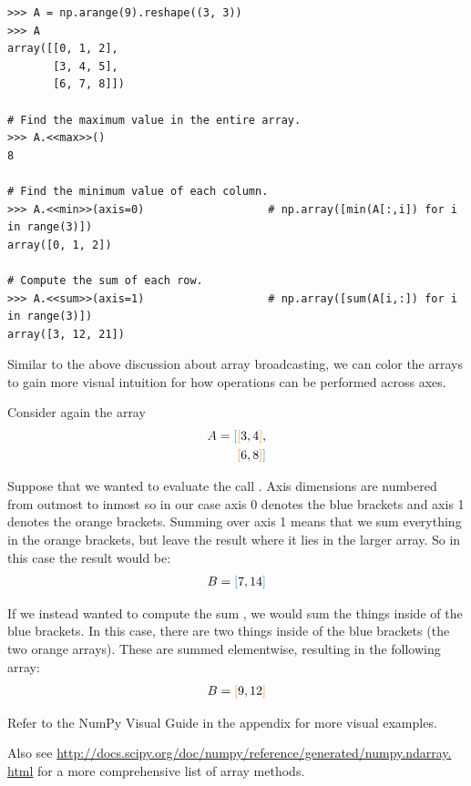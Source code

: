 \begin{lstlisting}
>>> A = np.arange(9).reshape((3, 3))
>>> A
array([[0, 1, 2],
       [3, 4, 5],
       [6, 7, 8]])

# Find the maximum value in the entire array.
>>> A.<<max>>()
8

# Find the minimum value of each column.
>>> A.<<min>>(axis=0)                   # np.array([min(A[:,i]) for i in range(3)])
array([0, 1, 2])

# Compute the sum of each row.
>>> A.<<sum>>(axis=1)                   # np.array([sum(A[i,:]) for i in range(3)])
array([3, 12, 21])
\end{lstlisting}

Similar to the above discussion about array broadcasting, we can color the arrays to gain more visual intuition for how operations can be performed across axes.

Consider again the array
\begin{align*}
A = \textcolor{blue}{[} \textcolor{orange}{[} 3, 4 \textcolor{orange}{]}, \\
\textcolor{orange}{[} 6, 8 \textcolor{orange}{]} \textcolor{blue}{]}
\end{align*}

Suppose that we wanted to evaluate the call .
Axis dimensions are numbered from outmost to inmost so in our case axis 0 denotes the blue brackets and axis 1 denotes the orange brackets.
Summing over axis 1 means that we sum everything in the orange brackets, but leave the result where it lies in the larger array.
So in this case the result would be:
\begin{align*}
B = \textcolor{blue}{[} 7, 14 \textcolor{blue}{]}
\end{align*}

If we instead wanted to compute the sum  , we would sum the things inside of the blue brackets.
In this case, there are two things inside of the blue brackets (the two orange arrays).
These are summed elementwise, resulting in the following array:
\begin{align*}
B = \textcolor{orange}{[} 9, 12 \textcolor{orange}{]}
\end{align*}


Refer to the NumPy Visual Guide in the appendix for more visual examples.

Also see \url{http://docs.scipy.org/doc/numpy/reference/generated/numpy.ndarray.
html} for a more comprehensive list of array methods.


